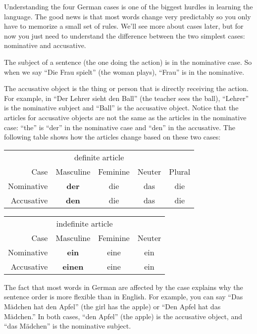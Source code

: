 Understanding the four German cases is one of the biggest hurdles in learning the language. The good news is that most words change very predictably so you only have to memorize a small set of rules. We'll see more about cases later, but for now you just need to understand the difference between the two simplest cases: nominative and accusative.

The subject of a sentence (the one doing the action) is in the nominative case. So when we say ``Die Frau spielt'' (the woman plays), ``Frau'' is in the nominative.

The accusative object is the thing or person that is directly receiving the action. For example, in ``Der Lehrer sieht den Ball'' (the teacher sees the ball), ``Lehrer'' is the nominative subject and ``Ball'' is the accusative object. Notice that the articles for accusative objects are not the same as the articles in the nominative case: ``the'' is ``der'' in the nominative case and ``den'' in the accusative. The following table shows how the articles change based on these two cases:

\begin{center}\begin{tabular}{r|c|c|c|c}
  \multicolumn{5}{c}{definite article} \\
  Case & Masculine & Feminine  & Neuter & Plural \\
	\hline
	Nominative & \textbf{der} & die & das & die \\
	Accusative & \textbf{den} & die & das & die \\
\end{tabular}\end{center}

\begin{center}\begin{tabular}{r|c|c|c}
  \multicolumn{4}{c}{indefinite article} \\
  Case & Masculine & Feminine  & Neuter \\
	\hline
	Nominative & \textbf{ein} & eine & ein \\
	Accusative & \textbf{einen} & eine & ein \\
\end{tabular}\end{center}

The fact that most words in German are affected by the case explains why the sentence order is more flexible than in English. For example, you can say ``Das M{\"a}dchen hat den Apfel'' (the girl has the apple) or ``Den Apfel hat das M{\"a}dchen.'' In both cases, ``den Apfel'' (the apple) is the accusative object, and ``das M{\"a}dchen'' is the nominative subject.

